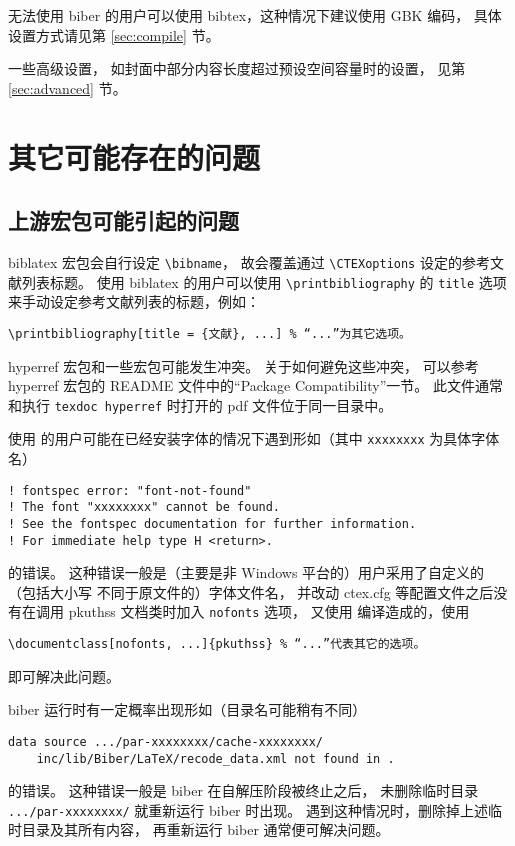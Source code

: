 	无法使用 biber 的用户可以使用 bibtex，这种情况下建议使用 GBK 编码，
	具体设置方式请见第 \ref{sec:compile} 节。

	一些高级设置，
	如封面中部分内容长度超过预设空间容量时的设置，
	见第 \ref{sec:advanced} 节。

	\section{其它可能存在的问题}
		\subsection{上游宏包可能引起的问题}

		biblatex 宏包\supercite{biblatex}会自行设定 \verb|\bibname|，
		故会覆盖通过 \verb|\CTEXoptions| 设定的参考文献列表标题。
		使用 biblatex 的用户可以使用 \verb|\printbibliography| 的
		\verb|title| 选项来手动设定参考文献列表的标题，例如：
\begin{Verbatim}[frame = single]
\printbibliography[title = {文献}, ...] % “...”为其它选项。
\end{Verbatim}

		hyperref 宏包\supercite{hyperref}和一些宏包可能发生冲突。
		关于如何避免这些冲突，
		可以参考 hyperref 宏包的 README 文件中的“Package Compatibility”一节。
		此文件通常和执行 \verb|texdoc hyperref| %
		时打开的 pdf 文件位于同一目录中。

		使用  的用户可能在已经安装字体的情况下遇到形如（其中
		\verb|xxxxxxxx| 为具体字体名）
\begin{Verbatim}[frame = single, fontsize = {\small}]
! fontspec error: "font-not-found"
! The font "xxxxxxxx" cannot be found.
! See the fontspec documentation for further information.
! For immediate help type H <return>.
\end{Verbatim}
		的错误。
		这种错误一般是（主要是非 Windows 平台的）用户采用了自定义的（包括大小写
		不同于原文件的）字体文件名，
		并改动 ctex.cfg 等配置文件之后没有在调用 pkuthss 文档类时加入
		\verb|nofonts| 选项，
		又使用  编译造成的，使用
\begin{Verbatim}[frame = single]
\documentclass[nofonts, ...]{pkuthss} % “...”代表其它的选项。
\end{Verbatim}
		即可解决此问题。

		biber 运行时有一定概率出现形如（目录名可能稍有不同）
\begin{Verbatim}[frame = single, fontsize = {\small}]
data source .../par-xxxxxxxx/cache-xxxxxxxx/
	inc/lib/Biber/LaTeX/recode_data.xml not found in .
\end{Verbatim}
		的错误。
		这种错误一般是 biber 在自解压阶段被终止之后，
		未删除临时目录 \verb|.../par-xxxxxxxx/| 就重新运行 biber 时出现。
		遇到这种情况时，删除掉上述临时目录及其所有内容，
		再重新运行 biber 通常便可解决问题。

